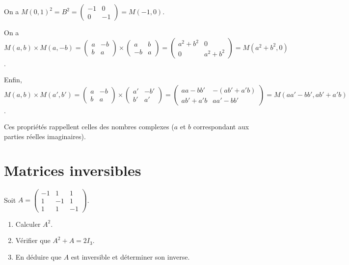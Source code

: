 \documentclass[11pt,fleqn]{book} %
\begin{document}
\begin{solution}On a $M(0,1)^2=B^2=\begin{pmatrix}-1&0\\0&-1\end{pmatrix}=M(-1,0)$.

On a $M(a,b) \times M(a,-b) = \begin{pmatrix}a&-b\\b&a\end{pmatrix} \times \begin{pmatrix}a&b\\-b&a\end{pmatrix} =\begin{pmatrix}a^2+b^2 & 0 \\ 0 & a^2+b^2\end{pmatrix}=M(a^2+b^2,0)$.

Enfin, $M(a,b) \times M(a',b')=\begin{pmatrix}a&-b\\b&a\end{pmatrix} \times \begin{pmatrix}a'&-b'\\b'&a'\end{pmatrix}=\begin{pmatrix}aa-bb' & -(ab'+a'b) \\ ab'+a'b & aa'-bb'\end{pmatrix} = M(aa'-bb',ab'+a'b)$.

Ces propriétés rappellent celles des nombres complexes ($a$ et $b$ correspondant aux parties réelles imaginaires).\end{solution}


\section*{Matrices inversibles}


\begin{exercise}[topic=mat03]
\begin{minipage}{0.3\linewidth}Soit $A=\begin{pmatrix}-1 & 1 & 1\\1&-1&1\\1&1&-1 \end{pmatrix}$.
\end{minipage}\hfill \begin{minipage}{0.65\linewidth}
\begin{enumerate}
\item Calculer $A^2$.
\item Vérifier que $A^2+A=2I_3$.
\item En déduire que $A$ est inversible et déterminer son inverse.
\end{enumerate}
\end{minipage}\end{exercise}
\end{document}

